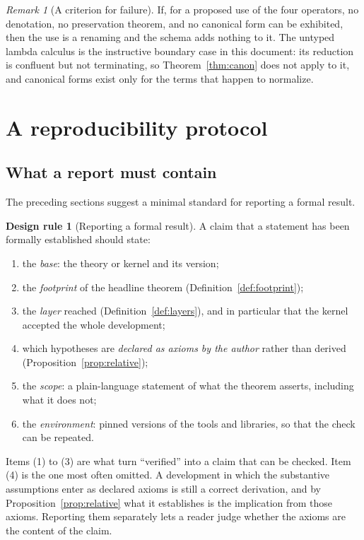 \documentclass[11pt]{article}
\theoremstyle{definition}
\newtheorem{designrule}[definition]{Design rule}
\theoremstyle{plain}
\theoremstyle{remark}
\newtheorem{remark}[definition]{Remark}
\begin{document}
\begin{remark}[A criterion for failure]\label{rem:fail}
If, for a proposed use of the four operators, no denotation, no preservation theorem, and no canonical form can be exhibited, then the use is a renaming and the schema adds nothing to it. The untyped lambda calculus is the instructive boundary case in this document: its reduction is confluent but not terminating, so Theorem~\ref{thm:canon} does not apply to it, and canonical forms exist only for the terms that happen to normalize.
\end{remark}

\section{A reproducibility protocol}\label{sec:protocol}

\subsection{What a report must contain}

The preceding sections suggest a minimal standard for reporting a formal result.

\begin{designrule}[Reporting a formal result]\label{dr:report}
A claim that a statement has been formally established should state:
\begin{enumerate}[label=(\arabic*)]
\item the \emph{base}: the theory or kernel and its version;
\item the \emph{footprint} of the headline theorem (Definition~\ref{def:footprint});
\item the \emph{layer} reached (Definition~\ref{def:layers}), and in particular that the kernel accepted the whole development;
\item which hypotheses are \emph{declared as axioms by the author} rather than derived (Proposition~\ref{prop:relative});
\item the \emph{scope}: a plain-language statement of what the theorem asserts, including what it does not;
\item the \emph{environment}: pinned versions of the tools and libraries, so that the check can be repeated.
\end{enumerate}
\end{designrule}

Items (1) to (3) are what turn ``verified'' into a claim that can be checked. Item (4) is the one most often omitted. A development in which the substantive assumptions enter as declared axioms is still a correct derivation, and by Proposition~\ref{prop:relative} what it establishes is the implication from those axioms. Reporting them separately lets a reader judge whether the axioms are the content of the claim.
\end{document}
